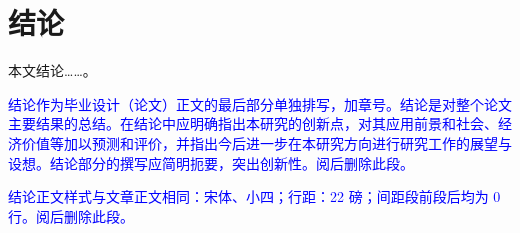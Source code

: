 %
%
%
%
%


\chapter{结论}


本文结论……。\cite{dengImageNetLargescaleHierarchical2010}

\textcolor{blue}{结论作为毕业设计（论文）正文的最后部分单独排写，加章号。结论是对整个论文主要结果的总结。在结论中应明确指出本研究的创新点，对其应用前景和社会、经济价值等加以预测和评价，并指出今后进一步在本研究方向进行研究工作的展望与设想。结论部分的撰写应简明扼要，突出创新性。阅后删除此段。}

\textcolor{blue}{结论正文样式与文章正文相同：宋体、小四；行距：22 磅；间距段前段后均为 0 行。阅后删除此段。}
